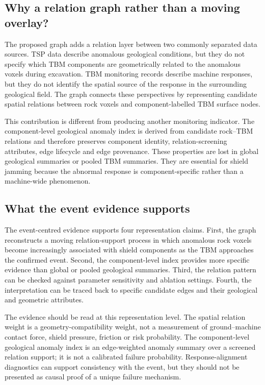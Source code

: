 \subsection{Why a relation graph rather than a moving overlay?}
The proposed graph adds a relation layer between two commonly separated data sources. TSP data describe anomalous geological conditions, but they do not specify which TBM components are geometrically related to the anomalous voxels during excavation. TBM monitoring records describe machine responses, but they do not identify the spatial source of the response in the surrounding geological field. The graph connects these perspectives by representing candidate spatial relations between rock voxels and component-labelled TBM surface nodes.

This contribution is different from producing another monitoring indicator. The component-level geological anomaly index is derived from candidate rock--TBM relations and therefore preserves component identity, relation-screening attributes, edge lifecycle and edge provenance. These properties are lost in global geological summaries or pooled TBM summaries. They are essential for shield jamming because the abnormal response is component-specific rather than a machine-wide phenomenon.

\subsection{What the event evidence supports}
The event-centred evidence supports four representation claims. First, the graph reconstructs a moving relation-support process in which anomalous rock voxels become increasingly associated with shield components as the TBM approaches the confirmed event. Second, the component-level index provides more specific evidence than global or pooled geological summaries. Third, the relation pattern can be checked against parameter sensitivity and ablation settings. Fourth, the interpretation can be traced back to specific candidate edges and their geological and geometric attributes.

The evidence should be read at this representation level. The spatial relation weight is a geometry-compatibility weight, not a measurement of ground--machine contact force, shield pressure, friction or risk probability. The component-level geological anomaly index is an edge-weighted anomaly summary over a screened relation support; it is not a calibrated failure probability. Response-alignment diagnostics can support consistency with the event, but they should not be presented as causal proof of a unique failure mechanism.

